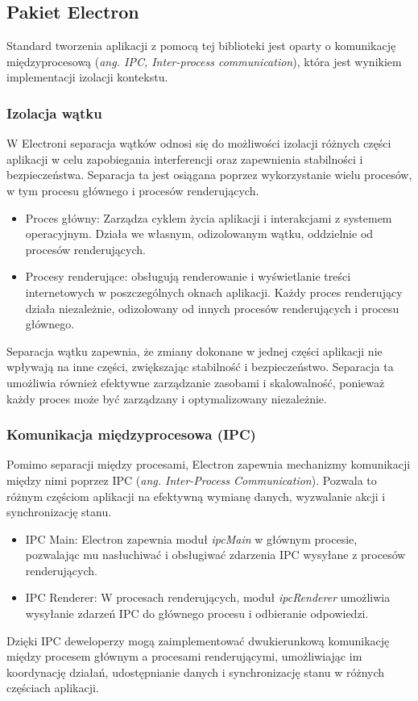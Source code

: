 \documentclass[12pt,a4paper,twoside]{article}
\begin{document}
\subsection{Pakiet Electron}
Standard tworzenia aplikacji z pomocą tej biblioteki jest oparty o komunikację międzyprocesową (\textit{ang. IPC, Inter-process communication}), która jest wynikiem implementacji izolacji kontekstu. 
\subsubsection*{Izolacja wątku}
W Electroni separacja wątków odnosi się do możliwości izolacji różnych części aplikacji w celu zapobiegania interferencji oraz zapewnienia stabilności i bezpieczeństwa. Separacja ta jest osiągana poprzez wykorzystanie wielu procesów, w tym procesu głównego i procesów renderujących.
\begin{itemize}
	\item Proces główny: Zarządza cyklem życia aplikacji i interakcjami z systemem operacyjnym. Działa we własnym, odizolowanym wątku, oddzielnie od procesów renderujących.
	\item Procesy renderujące: obsługują renderowanie i wyświetlanie treści internetowych w poszczególnych oknach aplikacji. Każdy proces renderujący działa niezależnie, odizolowany od innych procesów renderujących i procesu głównego.
\end{itemize}
Separacja wątku zapewnia, że zmiany dokonane w jednej części aplikacji nie wpływają na inne części, zwiększając stabilność i bezpieczeństwo. Separacja ta umożliwia również efektywne zarządzanie zasobami i skalowalność, ponieważ każdy proces może być zarządzany i optymalizowany niezależnie.
\subsubsection*{Komunikacja międzyprocesowa (IPC)}
Pomimo separacji między procesami, Electron zapewnia mechanizmy komunikacji między nimi poprzez IPC (\textit{ang. Inter-Process Communication}). Pozwala to różnym częściom aplikacji na efektywną wymianę danych, wyzwalanie akcji i synchronizację stanu.
\begin{itemize}
	\item IPC Main: Electron zapewnia moduł \textit{ipcMain} w głównym procesie, pozwalając mu nasłuchiwać i obsługiwać zdarzenia IPC wysyłane z procesów renderujących.
	\item IPC Renderer: W procesach renderujących, moduł \textit{ipcRenderer}	 umożliwia wysyłanie zdarzeń IPC do głównego procesu i odbieranie odpowiedzi.
\end{itemize}
Dzięki IPC deweloperzy mogą zaimplementować dwukierunkową komunikację między procesem głównym a procesami renderującymi, umożliwiając im koordynację działań, udostępnianie danych i synchronizację stanu w różnych częściach aplikacji.\par
\newpage
\end{document}
